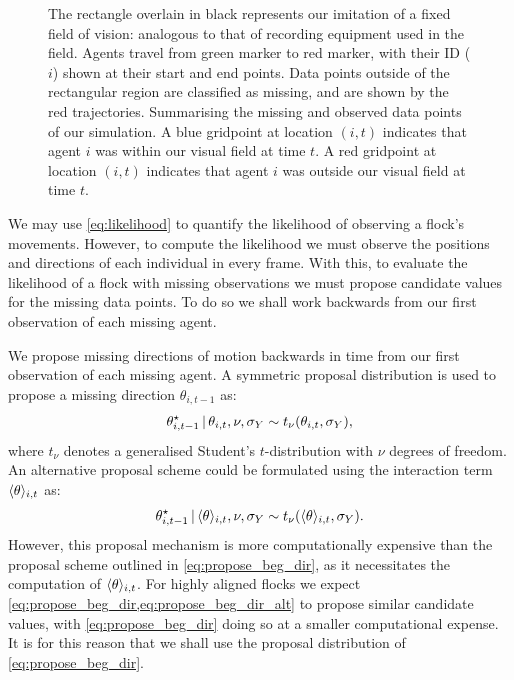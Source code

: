 \begin{figure}[tbp]
{    The rectangle overlain in black represents our imitation of a fixed
    field of vision: analogous to that of recording equipment used in the
    field. Agents travel from green marker to red marker, with their ID ($i$)
    shown at their start and end points. Data points outside of the rectangular
    region are classified as missing, and are shown by the red trajectories.
     Summarising the missing and observed data
    points of our simulation. A blue gridpoint at location $(i, t)$ indicates
    that agent $i$ was within our visual field at time $t$. A red gridpoint at
    location $(i, t)$ indicates that agent $i$ was outside our visual field
    at time $t$.}
  \label{fig:beg_data}
\end{figure}

We may use \cref{eq:likelihood} to quantify the likelihood of observing a
flock's movements. However, to compute the likelihood we must observe the
positions and directions of each individual in every frame. With this, to
evaluate the likelihood of a flock with missing observations we must propose
candidate values for the missing data points. To do so we shall work backwards
from our first observation of each missing agent.

We propose missing directions of motion backwards in time from our first
observation of each missing agent. A symmetric proposal distribution is used
to propose a missing direction $\theta_{i,t-1}$ as:
\begin{equation}
  \label{eq:propose_beg_dir}
  \theta_{i,t-1}^{\star} \,|\,  \theta_{i,t}, \nu, \sigma_Y
    \sim t_{\nu}(\theta_{i,t}, \sigma_Y),
\end{equation}
where $t_{\nu}$ denotes a generalised Student's $t$-distribution with $\nu$
degrees of freedom. An alternative proposal scheme could be formulated using
the interaction term $\langle\theta\rangle_{i,t}$ as:
\begin{equation}
  \label{eq:propose_beg_dir_alt}
  \theta_{i,t-1}^{\star} \,|\, \langle\theta\rangle_{i,t}, \nu, \sigma_Y
    \sim t_{\nu}(\langle\theta\rangle_{i,t}, \sigma_Y).
\end{equation}
However, this proposal mechanism is more computationally expensive than the
proposal scheme outlined in \cref{eq:propose_beg_dir}, as it necessitates the
computation of $\langle\theta\rangle_{i,t}$. For highly aligned flocks we expect
\cref{eq:propose_beg_dir,eq:propose_beg_dir_alt} to propose similar candidate
values, with \cref{eq:propose_beg_dir} doing so at a smaller computational
expense. It is for this reason that we shall use the proposal distribution of
\cref{eq:propose_beg_dir}.

